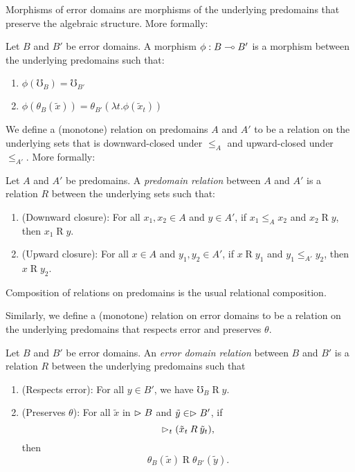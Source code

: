 Morphisms of error domains are morphisms of the underlying predomains that preserve the
algebraic structure. More formally:
%
\begin{definition}
Let $B$ and $B'$ be error domains.
A morphism $\phi : B \mathrel{\multimap} B'$ is a morphism between the underlying predomains such that:
\begin{enumerate}
    \item $\phi(\mho_B) = \mho_{B'}$
    \item $\phi(\theta_B(\tilde{x})) = \theta_{B'}(\lambda t. \phi(\tilde{x}_t))$
\end{enumerate}
\end{definition}


We define a (monotone) relation on predomains $A$ and $A'$ to be a relation on the
underlying sets that is downward-closed under $\le_A$ and upward-closed under $\le_{A'}$.
More formally:

\begin{definition}
Let $A$ and $A'$ be predomains. A \emph{predomain relation} between $A$ and $A'$
is a relation $R$ between the underlying sets such that:
\begin{enumerate}
    \item (Downward closure): For all $x_1, x_2 \in A$ and $y \in A'$,
    if $x_1 \le_A x_2$ and $x_2 \mathbin{R} y$, then $x_1 \mathbin{R} y$.
    \item (Upward closure): For all $x \in A$ and $y_1, y_2 \in A'$,
    if $x \mathbin{R} y_1$ and $y_1 \le_{A'} y_2$, then $x \mathbin{R} y_2$.
\end{enumerate}
\end{definition}

Composition of relations on predomains is the usual relational composition.

Similarly, we define a (monotone) relation on error domains to be a relation on the
underlying predomains that respects error and preserves $\theta$.
%
\begin{definition}
    Let $B$ and $B'$ be error domains. An \emph{error domain relation} between
    $B$ and $B'$ is a relation $R$ between the underlying predomains such that
    \begin{enumerate}
       \item (Respects error): For all $y \in B'$, we have $\mho_B \mathbin{R} y$.
       \item (Preserves $\theta$): For all $\tilde{x}$ in $\vartriangleright B$ and $\tilde{y} \in \vartriangleright B'$,
       if 
       \[ \vartriangleright_t( \tilde{x}_t \mathbin{R} \tilde{y}_t ), \]
       then
       \[ \theta_B(\tilde{x}) \mathbin{R} \theta_{B'}(\tilde{y}). \]
    \end{enumerate}
\end{definition}


